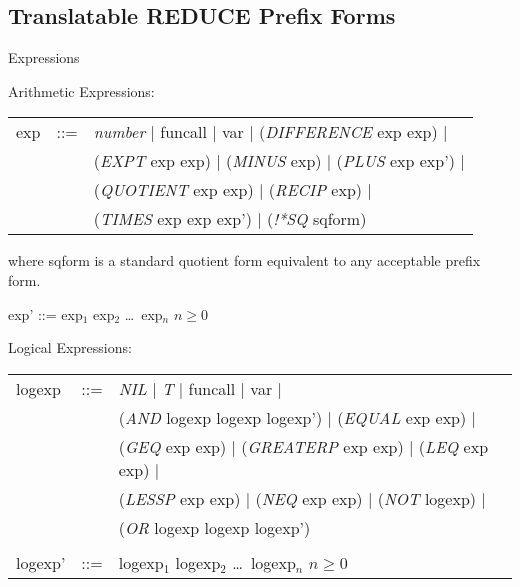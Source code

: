 \subsection{Translatable REDUCE Prefix Forms}
\begin{describe}{Expressions}

Arithmetic Expressions:

\begin{tabular}{lll}
exp & ::= & {\it number\/} $\mid$  funcall  $\mid$  var  $\mid$ 
({\it DIFFERENCE\/} exp exp) $\mid$\\
& &({\it EXPT\/} exp exp)  $\mid$  ({\it MINUS\/} exp)  $\mid$  ({\it PLUS\/} exp exp') $\mid$\\
& & ({\it QUOTIENT\/} exp exp)  $\mid$  ({\it RECIP\/} exp) $\mid$\\
& & ({\it TIMES\/} exp exp exp')  $\mid$  ({\it !*SQ\/} sqform)\\
\end{tabular}

where sqform is a standard quotient form equivalent to any acceptable prefix
form.

exp' ::=  exp$_1$ exp$_2$ \dots\  exp$_n$  $n \geq 0$

Logical Expressions:

\begin{tabular}{lll}
logexp & ::= & {\it NIL\/} $\mid$ {\it T\/} $\mid$  funcall  $\mid$  var $\mid$\\
& &  ({\it AND\/} logexp logexp logexp')  $\mid$  ({\it EQUAL\/} exp exp) $\mid$\\
& & ({\it GEQ\/} exp exp)  $\mid$  ({\it GREATERP\/} exp exp)  $\mid$  ({\it LEQ\/} exp exp) $\mid$\\
& & ({\it LESSP\/} exp exp)  $\mid$  ({\it NEQ\/} exp exp)  $\mid$  ({\it NOT\/} logexp) $\mid$\\
& & ({\it OR\/} logexp logexp logexp')\\
& &\\
logexp' & ::= & logexp$_1$ logexp$_2$ \dots\  logexp$_n$  $n \geq 0$\\
\end{tabular}
\end{describe}

